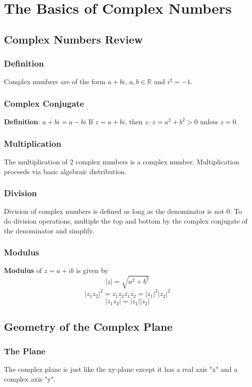 \documentclass[../main.tex]{subfiles}
\begin{document}
\chapter{The Basics of Complex Numbers}
\section{Complex Numbers Review}
\subsection{Definition}
    Complex numbers are of the form $a+bi$, $a,b\in\mathbb{R}$ and $i^{2}=-1$.

\subsection{Complex Conjugate}
    \textbf{Definition}: $\overline{a+bi}=a-bi$
    If $z=a+bi$, then $z\cdot\overline{z}=a^{2}+b^{2} > 0$ unless $z=0$.

\subsection{Multiplication}
    The multiplication of 2 complex numbers is a complex number. Multiplication proceeds via
    basic algebraic distribution.

\subsection{Division}
    Division of complex numbers is defined as long as the denominator is not 0.
    To do division operations, multiple the top and bottom by the complex conjugate of the 
    denominator and simplify.

\subsection{Modulus}
    \textbf{Modulus} of $z=a+ib$ is given by
    $$|z|=\sqrt{a^{2}+b^{2}}$$
    $$|z_{1}z_{2}|^{2}=z_{1}z_{2}\overline{z_{1}}\overline{z_{2}}=|z_{1}|^{2}|z_{2}|^{2}$$
    $$|z_{1}z_{2}|=|z_{1}||z_{2}|$$

\section{Geometry of the Complex Plane}
\subsection{The Plane}
    The complex plane is just like the xy-plane except it has a real axis "x" and a complex axis "y".
\end{document}
